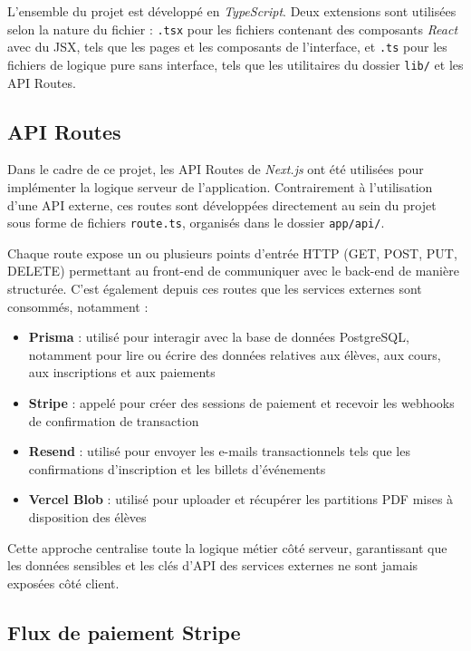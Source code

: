\documentclass{article}
\begin{document}
L'ensemble du projet est développé en \textit{TypeScript}. 
Deux extensions sont utilisées selon la nature du fichier : 
\texttt{.tsx} pour les fichiers contenant des composants 
\textit{React} avec du JSX, tels que les pages et les 
composants de l'interface, et \texttt{.ts} pour les fichiers 
de logique pure sans interface, tels que les utilitaires 
du dossier \texttt{lib/} et les API Routes.

\subsection{API Routes}

Dans le cadre de ce projet, les API Routes de \textit{Next.js} ont 
été utilisées pour implémenter la logique serveur de l'application. 
Contrairement à l'utilisation d'une API externe, ces routes sont 
développées directement au sein du projet sous forme de fichiers 
\texttt{route.ts}, organisés dans le dossier \texttt{app/api/}.

Chaque route expose un ou plusieurs points d'entrée HTTP (GET, POST, 
PUT, DELETE) permettant au front-end de communiquer avec le back-end 
de manière structurée. C'est également depuis ces routes que les 
services externes sont consommés, notamment :

\begin{itemize}
    \item \textbf{Prisma} : utilisé pour interagir avec la base 
    de données PostgreSQL, notamment pour lire ou écrire des 
    données relatives aux élèves, aux cours, aux inscriptions 
    et aux paiements
    \item \textbf{Stripe} : appelé pour créer des sessions de 
    paiement et recevoir les webhooks de confirmation de transaction
    \item \textbf{Resend} : utilisé pour envoyer les e-mails 
    transactionnels tels que les confirmations d'inscription 
    et les billets d'événements
    \item \textbf{Vercel Blob} : utilisé pour uploader et 
    récupérer les partitions PDF mises à disposition des élèves
\end{itemize}

Cette approche centralise toute la logique métier côté serveur, 
garantissant que les données sensibles et les clés d'API des 
services externes ne sont jamais exposées côté client.

\subsection{Flux de paiement Stripe}
\end{document}
